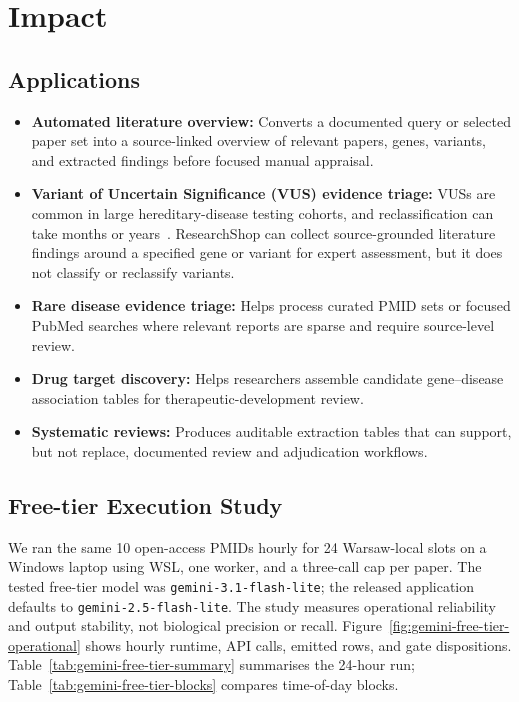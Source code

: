 \section{Impact}
\label{sec:impact}

 

\subsection{Applications}

\begin{itemize}[itemsep=2pt]
    \item \textbf{Automated literature overview:} Converts a documented query or selected paper set into a source-linked overview of relevant papers, genes, variants, and extracted findings before focused manual appraisal.
    \item \textbf{Variant of Uncertain Significance (VUS) evidence triage:} VUSs are common in large hereditary-disease testing cohorts, and reclassification can take months or years~\cite{chen2023vus}. ResearchShop can collect source-grounded literature findings around a specified gene or variant for expert assessment, but it does not classify or reclassify variants.
    \item \textbf{Rare disease evidence triage:} Helps process curated PMID sets or focused PubMed searches where relevant reports are sparse and require source-level review.
    \item \textbf{Drug target discovery:} Helps researchers assemble candidate gene--disease association tables for therapeutic-development review.
    \item \textbf{Systematic reviews:} Produces auditable extraction tables that can support, but not replace, documented review and adjudication workflows.
\end{itemize}

\subsection{Free-tier Execution Study}

We ran the same 10 open-access PMIDs hourly for 24 Warsaw-local slots on a Windows laptop using WSL, one worker, and a three-call cap per paper. The tested free-tier model was \texttt{gemini-3.1-flash-lite}; the released application defaults to \texttt{gemini-2.5-flash-lite}. The study measures operational reliability and output stability, not biological precision or recall. Figure~\ref{fig:gemini-free-tier-operational} shows hourly runtime, API calls, emitted rows, and gate dispositions. Table~\ref{tab:gemini-free-tier-summary} summarises the 24-hour run; Table~\ref{tab:gemini-free-tier-blocks} compares time-of-day blocks.

